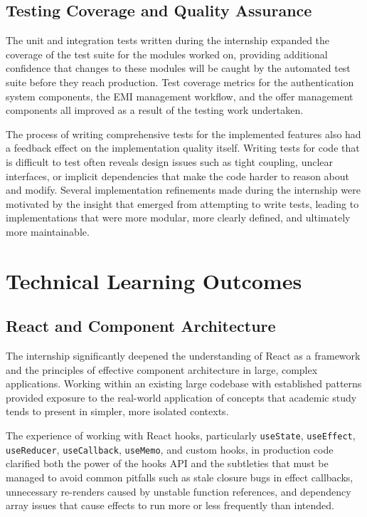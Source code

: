 \subsection{Testing Coverage and Quality Assurance}

The unit and integration tests written during the internship expanded the coverage of the test suite for the modules worked on, providing additional confidence that changes to these modules will be caught by the automated test suite before they reach production. Test coverage metrics for the authentication system components, the EMI management workflow, and the offer management components all improved as a result of the testing work undertaken.

The process of writing comprehensive tests for the implemented features also had a feedback effect on the implementation quality itself. Writing tests for code that is difficult to test often reveals design issues such as tight coupling, unclear interfaces, or implicit dependencies that make the code harder to reason about and modify. Several implementation refinements made during the internship were motivated by the insight that emerged from attempting to write tests, leading to implementations that were more modular, more clearly defined, and ultimately more maintainable.

\section{Technical Learning Outcomes}

\subsection{React and Component Architecture}

The internship significantly deepened the understanding of React as a framework and the principles of effective component architecture in large, complex applications. Working within an existing large codebase with established patterns provided exposure to the real-world application of concepts that academic study tends to present in simpler, more isolated contexts.

The experience of working with React hooks, particularly \texttt{useState}, \texttt{useEffect}, \texttt{useReducer}, \texttt{useCallback}, \texttt{useMemo}, and custom hooks, in production code clarified both the power of the hooks API and the subtleties that must be managed to avoid common pitfalls such as stale closure bugs in effect callbacks, unnecessary re-renders caused by unstable function references, and dependency array issues that cause effects to run more or less frequently than intended.

